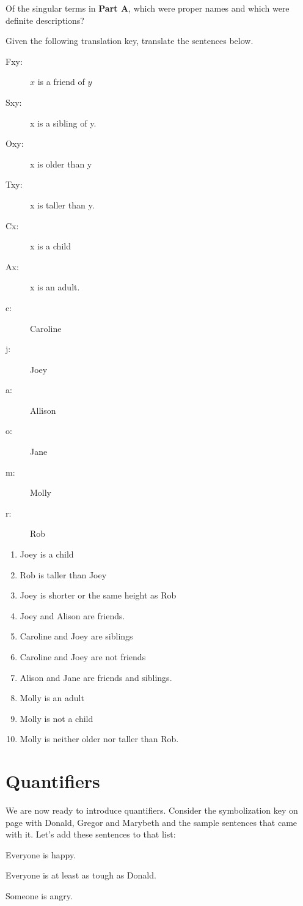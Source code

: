 \problempart Of the singular terms in \textbf{Part A}, which were proper names and which were definite descriptions?


\problempart
Given the following translation key, translate the sentences below.

\begin{description}
\item [Fxy:] $x$ is a friend of $y$
\item [Sxy:] x is a sibling of y. 
\item [Oxy:]x is older than y
\item [Txy:] x is taller than y.
\item [Cx:]	 x is a child
\item [Ax:]	 x is an adult.
\item [c:]	 Caroline
\item [j:]	 Joey
\item [a:] Allison 
\item [o:] Jane
\item [m:]	Molly
\item [r:]	Rob
\end{description}


\begin{enumerate}[label=\arabic*)]
\item Joey is a child
\item Rob is taller than Joey
\item Joey is shorter or the same height as Rob
\item Joey and Alison are friends.
\item Caroline and Joey are siblings
\item Caroline and Joey are not friends
\item Alison and Jane are friends and siblings.
\item Molly is an adult
\item Molly is not a child
\item Molly is neither older nor taller than Rob.
\end{enumerate} 


\section{Quantifiers}

\setlength{\parindent}{1em}

We are now ready to introduce quantifiers. Consider the symbolization key on page \pageref{DMG_symbolization_key} with Donald, Gregor and Marybeth and the sample sentences that came with it. Let's add these sentences to that list:
\begin{kormanize}
\item[\ex{q.a}] Everyone is happy.
\item[\ex{q.ac}] Everyone is at least as tough as Donald.
\item[\ex{q.e}] Someone is angry.
\end{kormanize}

